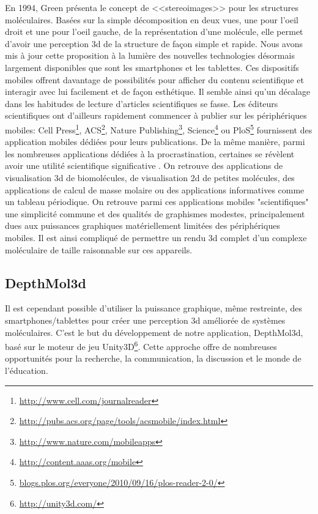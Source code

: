 En 1994, Green présenta le concept de <<stereoimages>> \cite{green_stereoimages_1994} pour les structures moléculaires. Basées sur la simple décomposition en deux vues, une pour l'oeil droit et une pour l'oeil gauche, de la représentation d'une molécule, elle permet d'avoir une perception 3d de la structure de façon simple et rapide. Nous avons mis à jour cette proposition à la lumière des nouvelles technologies désormais largement disponibles que sont les smartphones et les tablettes. Ces dispositifs mobiles offrent davantage de possibilités pour afficher du contenu scientifique et interagir avec lui facilement et de façon esthétique. Il semble ainsi qu'un décalage dans les habitudes de lecture d'articles scientifiques se fasse. Les éditeurs scientifiques ont d'ailleurs rapidement commencer à publier sur les périphériques mobiles: Cell Press\footnote{\url{http://www.cell.com/journalreader}}, ACS\footnote{\url{http://pubs.acs.org/page/tools/acsmobile/index.html}}, Nature Publishing\footnote{\url{http://www.nature.com/mobileapps}}, Science\footnote{\url{http://content.aaas.org/mobile}} ou PloS\footnote{\url{blogs.plos.org/everyone/2010/09/16/plos-reader-2-0/}} fournissent des application mobiles dédiées pour leurs publications. De la même manière, parmi les nombreuses applications dédiées à la procrastination, certaines se révèlent avoir une utilité scientifique significative \cite{powell_lab_2012}. On retrouve des applications de visualisation 3d de biomolécules, de visualisation 2d de petites molécules, des applications de calcul de masse molaire ou des applications informatives comme un tableau périodique. On retrouve parmi ces applications mobiles "scientifiques" une simplicité commune et des qualités de graphismes modestes, principalement dues aux puissances graphiques matériellement limitées des périphériques mobiles. Il est ainsi compliqué de permettre un rendu 3d complet d'un complexe moléculaire de taille raisonnable sur ces appareils. 

\subsection{DepthMol3d}

Il est cependant possible d'utiliser la puissance graphique, même restreinte, des smartphones/tablettes pour créer une perception 3d améliorée de systèmes moléculaires. C'est le but du développement de notre application, DepthMol3d, basé sur le moteur de jeu Unity3D\footnote{\url{http://unity3d.com/}}. Cette approche offre de nombreuses opportunités pour la recherche, la communication, la discussion et le monde de l'éducation.

